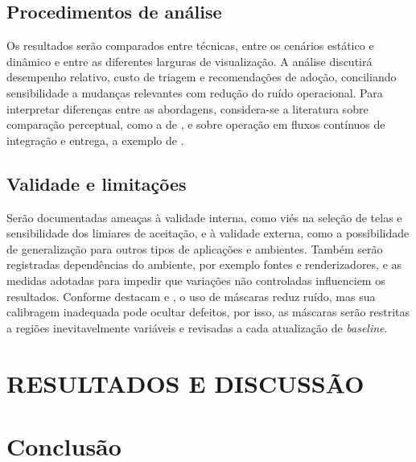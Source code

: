 \documentclass{UNESC}
\begin{document}
\subsection{Procedimentos de análise}
Os resultados serão comparados entre técnicas, entre os cenários estático e dinâmico e entre as diferentes larguras de visualização. A análise discutirá desempenho relativo, custo de triagem e recomendações de adoção, conciliando sensibilidade a mudanças relevantes com redução do ruído operacional. Para interpretar diferenças entre as abordagens, considera-se a literatura sobre comparação perceptual, como a de , e sobre operação em fluxos contínuos de integração e entrega, a exemplo de .

\subsection{Validade e limitações}
Serão documentadas ameaças à validade interna, como viés na seleção de telas e sensibilidade dos limiares de aceitação, e à validade externa, como a possibilidade de generalização para outros tipos de aplicações e ambientes. Também serão registradas dependências do ambiente, por exemplo fontes e renderizadores, e as medidas adotadas para impedir que variações não controladas influenciem os resultados. Conforme destacam  e , o uso de máscaras reduz ruído, mas sua calibragem inadequada pode ocultar defeitos, por isso, as máscaras serão restritas a regiões inevitavelmente variáveis e revisadas a cada atualização de \emph{baseline}.


\section{RESULTADOS E DISCUSSÃO}



\section{Conclusão}



\renewcommand{\refname}{REFERÊNCIAS}

\end{document}
